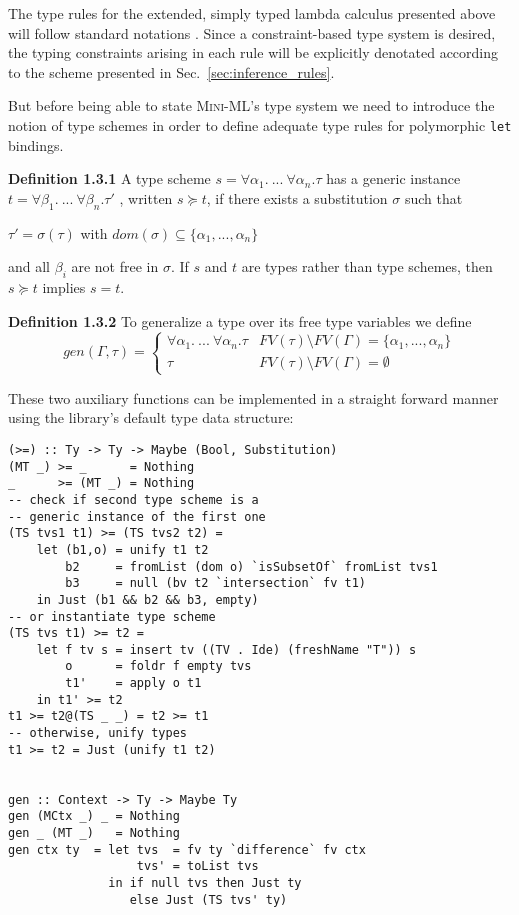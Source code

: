 The type rules for the extended, simply typed lambda calculus
presented above will follow standard notations \cite{Tapl}. Since a
constraint-based type system is desired, the typing constraints
arising in each rule will be explicitly denotated according to the
scheme presented in Sec.~\ref{sec:inference_rules}.

But before being able to state \textsc{Mini-ML}'s type system we need
to introduce the notion of type schemes in order to define adequate
type rules for polymorphic \texttt{let} bindings.

\bigskip\noindent
\textbf{Definition 1.3.1}
A type scheme
$s = \forall \alpha_1 .\ ...\ \forall \alpha_n . \tau$
has a generic instance
$t = \forall \beta_1 .\ ...\ \forall \beta_n . \tau'$ ,
written $s \succeq t$, if there exists a substitution $\sigma$
such that
\begin{center}
$\tau' = \sigma (\tau)$ with $dom(\sigma) \subseteq
                             \{\alpha_1, ... , \alpha_n\}$
\end{center}
\noindent
and all $\beta_i$ are not free in $\sigma$. If $s$ and $t$ are types
rather than type schemes, then $s \succeq t$ implies $s = t$.

\bigskip\noindent
\textbf{Definition 1.3.2} To generalize a type over its free type
variables we define
\[ gen(\Gamma, \tau) =
\begin{cases}
\forall \alpha_1 .\ ...\
\forall \alpha_n . \tau & FV(\tau) \setminus FV(\Gamma) =
                          \{\alpha_1, ... , \alpha_n\} \\
\tau                    & FV(\tau) \setminus FV(\Gamma) = \emptyset
\end{cases} \]

These two auxiliary functions can be implemented in a straight forward
manner using the library's default type data structure:

\begin{lstlisting}
(>=) :: Ty -> Ty -> Maybe (Bool, Substitution)
(MT _) >= _      = Nothing
_      >= (MT _) = Nothing
-- check if second type scheme is a
-- generic instance of the first one
(TS tvs1 t1) >= (TS tvs2 t2) =
    let (b1,o) = unify t1 t2
        b2     = fromList (dom o) `isSubsetOf` fromList tvs1
        b3     = null (bv t2 `intersection` fv t1)
    in Just (b1 && b2 && b3, empty)
-- or instantiate type scheme
(TS tvs t1) >= t2 =
    let f tv s = insert tv ((TV . Ide) (freshName "T")) s 
        o      = foldr f empty tvs
        t1'    = apply o t1
    in t1' >= t2
t1 >= t2@(TS _ _) = t2 >= t1
-- otherwise, unify types
t1 >= t2 = Just (unify t1 t2)


gen :: Context -> Ty -> Maybe Ty
gen (MCtx _) _ = Nothing
gen _ (MT _)   = Nothing
gen ctx ty  = let tvs  = fv ty `difference` fv ctx
                  tvs' = toList tvs
              in if null tvs then Just ty
                 else Just (TS tvs' ty)
\end{lstlisting}

